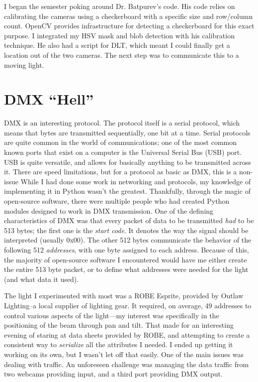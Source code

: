 \documentclass[
    12pt,
    twoside,
    bibstyle=chicago,
    headerstyle=uppercase,
	bibfile=biblatex_updating.bib
]{reedthesis}
\begin{document}
I began the semester poking around Dr. Batpurev's code. His code relies on calibrating the cameras using a checkerboard with a specific size and row/column count. OpenCV provides infrastructure for detecting a checkerboard for this exact purpose. I integrated my HSV mask and blob detection with his calibration technique. He also had a script for DLT, which meant I could finally get a location out of the two cameras. The next step was to communicate this to a moving light.

\section{DMX ``Hell''}
DMX is an interesting protocol. The protocol itself is a serial protocol, which means that bytes are transmitted sequentially, one bit at a time. Serial protocols are quite common in the world of communications; one of the most common known ports that exist on a computer is the Universal Serial Bus (USB) port. USB is quite versatile, and allows for basically anything to be transmitted across it. There are speed limitations, but for a protocol as basic as DMX, this is a non-issue While I had done some work in networking and protocols, my knowledge of implementing it in Python wasn't the greatest. Thankfully, through the magic of open-source software, there were multiple people who had created Python modules designed to work in DMX transmission. One of the defining characteristics of DMX was that every packet of data to be transmitted \textit{had} to be 513 bytes; the first one is the \textit{start code}. It denotes the way the signal should be interpreted (usually 0x00). The other 512 bytes communicate the behavior of the following 512 \textit{addresses}, with one byte assigned to each address. Because of this, the majority of open-source software I encountered would have me either create the entire 513 byte packet, or to define what addresses were needed for the light (and what data it used).

The light I experimented with most was a ROBE Esprite, provided by Outlaw Lighting--a local supplier of lighting gear. It required, on average, 49 addresses to control various aspects of the light---my interest was specifically in the positioning of the beam through pan and tilt. That made for an interesting evening of staring at data sheets provided by ROBE, and attempting to create a consistent way to \textit{serialize} all the attributes I needed. I ended up getting it working on its own, but I wasn't let off that easily. One of the main issues was dealing with traffic. An unforeseen challenge was managing the data traffic from two webcams providing input, and a third port providing DMX output.
\end{document}
